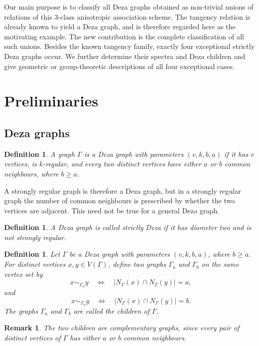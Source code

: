 \documentclass{article}
\theoremstyle{plain}
\newtheorem{rem}[thm]{Remark}
\newtheorem{defn}[thm]{Definition}
\begin{document}
Our main purpose is to classify all Deza graphs obtained as non-trivial unions of relations of this $3$-class anisotropic association scheme. The tangency relation is already known to yield a Deza graph, and is therefore regarded here as the motivating example. The new contribution is the complete classification of all such unions. Besides the known tangency family, exactly four exceptional strictly Deza graphs occur. We further determine their spectra and Deza children and give geometric or group-theoretic descriptions of all four exceptional cases.



\section{Preliminaries}

\subsection{Deza graphs}

\begin{defn}
A graph $\Gamma$ is a \emph{Deza graph} with parameters $(v,k,b,a)$ if it has $v$ vertices, is $k$-regular, and every two distinct vertices have either $a$ or $b$ common neighbours, where $b\geq a$.
\end{defn}

A strongly regular graph is therefore a Deza graph, but in a strongly regular graph the number of common neighbours is prescribed by whether the two vertices are adjacent. This need not be true for a general
Deza graph.

\begin{defn}
A Deza graph is called \emph{strictly Deza} if it has diameter two and is not strongly regular.
\end{defn}

\begin{defn}
Let $\Gamma$ be a Deza graph with parameters $(v,k,b,a)$, where $b\geq a$. For distinct vertices $x,y\in V(\Gamma)$, define two graphs $\Gamma_a$ and $\Gamma_b$ on the same vertex set by
\[
x\sim_{\Gamma_a} y
\quad\Longleftrightarrow\quad
|N_\Gamma(x)\cap N_\Gamma(y)|=a,
\]
and
\[
x\sim_{\Gamma_b} y
\quad\Longleftrightarrow\quad
|N_\Gamma(x)\cap N_\Gamma(y)|=b.
\]
The graphs $\Gamma_a$ and $\Gamma_b$ are called the
\emph{children} of $\Gamma$.
\end{defn}

\begin{rem}
The two children are complementary graphs, since every pair of distinct vertices of $\Gamma$ has either $a$ or $b$ common neighbours.
\end{rem}
\end{document}
